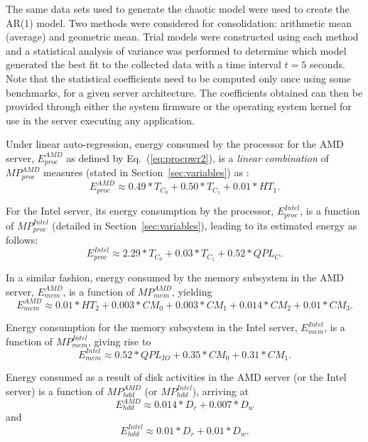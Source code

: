 \documentclass[prodmode,acmtaco,pdftex]{acmsmall}
\newcommand{\equationname}{Eq.}
\begin{document}
The same data sets used to generate the chaotic model were used to
create the AR(1) model. Two methods were considered for consolidation:
arithmetic mean (average) and geometric mean.  Trial models were
constructed using each method and a statistical analysis of variance was
performed to determine which model generated the best fit to the
collected data with a time interval $t=5$ seconds.  Note that the statistical coefficients need to be computed
only once using some benchmarks, for a given server architecture.
The coefficients obtained can then be provided through either
the system firmware or the operating system kernel for use in the server
executing any application.

Under linear auto-regression, energy consumed by the processor for the
AMD server, $E_{proc}^{AMD}$ as defined by
\equationname~(\ref{eq:procpwr2}), is a \textit{linear combination} of
$MP_{proc}^{AMD}$ measures (stated in Section~\ref{sec:variables}) as \cite{Lewis2008}:
\begin{equation*}
  \label{eq:apxproc}
  E_{proc}^{AMD} \approx 0.49*T_{C_{0}}+0.50*T_{C_{1}}+0.01*HT_{1}. 
\end{equation*}

For the Intel server, its energy consumption by the processor,
$E_{proc}^{Intel}$, is a function of $MP_{proc}^{Intel}$ (detailed in
Section~\ref{sec:variables}), leading to its estimated energy as follows:
\begin{equation*}
  \label{eq:apxpr}
  E_{proc}^{Intel} \approx 2.29*T_{C_{0}}+0.03*T_{C_{1}}+0.52*QPL_{C}.
\end{equation*}
 
In a similar fashion, energy consumed by the memory subsystem in the AMD server,
$E_{mem}^{AMD}$, is a function of $MP_{mem}^{AMD}$, yielding
\begin{equation*}
  \label{eq:apxmem}
  E_{mem}^{AMD} \approx 0.01*HT_{2}+0.003*CM_{0}+0.003*CM_{1}+0.014*CM_{2}+0.01*CM_{3}.
\end{equation*}

Energy consumption for the memory subsystem in the Intel server,
$E_{mem}^{Intel}$, is a function of $MP_{mem}^{Intel}$, giving rise to
\begin{equation*}
  E_{mem}^{Intel} \approx 0.52*QPL_{IO}+0.35*CM_{0}+0.31*CM_{1}. 
\end{equation*}

Energy consumed as a result of disk activities in the AMD server (or the
Intel server) is a function of $MP_{hdd}^{AMD}$ (or $MP_{hdd}^{Intel}$),
arriving at 
\begin{equation*}
E_{hdd}^{AMD} \approx 0.014*D_{r}+0.007*D_{w}
\end{equation*}
and
\begin{equation*}
E_{hdd}^{Intel} \approx 0.01*D_{r}+0.01*D_{w}.
\end{equation*}
\end{document}
